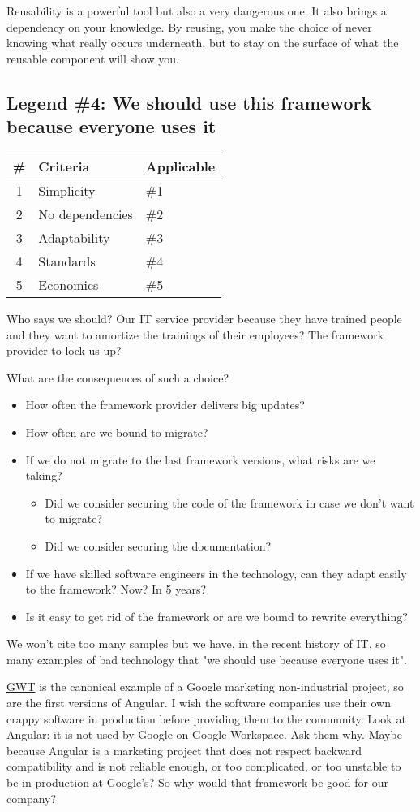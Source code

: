 \documentclass[]{article}
\newcommand{\criterias}[5]
{\begin{tabular}{|c|l|l|}
\textbf{\#} & \textbf{Criteria} & \textbf{Applicable} \\
\hline
1 & Simplicity      & \#1 \\
2 & No dependencies & \#2 \\
3 & Adaptability    & \#3 \\
4 & Standards       & \#4 \\
5 & Economics       & \#5 \\
\end{tabular}}
\begin{document}
Reusability is a powerful tool but also a very dangerous one. It also brings a dependency on your knowledge. By reusing, you make the choice of never knowing what really occurs underneath, but to stay on the surface of what the reusable component will show you.

\subsection{Legend \#4: We should use this framework because everyone uses it}

\criterias{Yes}{Yes}{Yes}{Yes}{Yes}

Who says we should? Our IT service provider because they have trained people and they want to amortize the trainings of their employees? The framework provider to lock us up?

What are the consequences of such a choice?

\begin{itemize}
\item How often the framework provider delivers big updates?
\item How often are we bound to migrate?
\item If we do not migrate to the last framework versions, what risks are we taking?
\begin{itemize}
\item Did we consider securing the code of the framework in case we don't want to migrate?
\item Did we consider securing the documentation?
\end{itemize}
\item If we have skilled software engineers in the technology, can they adapt easily to the framework? Now? In 5 years?
\item Is it easy to get rid of the framework or are we bound to rewrite everything?
\end{itemize}

We won't cite too many samples but we have, in the recent history of IT, so many examples of bad technology that "we should use because everyone uses it".

\href{https://en.wikipedia.org/wiki/Google_Web_Toolkit}{GWT} is the canonical example of a Google marketing non-industrial project, so are the first versions of Angular. I wish the software companies use their own crappy software in production before providing them to the community. Look at Angular: it is not used by Google on Google Workspace. Ask them why. Maybe because Angular is a marketing project that does not respect backward compatibility and is not reliable enough, or too complicated, or too unstable to be in production at Google's? So why would that framework be good for our company?
\end{document}
